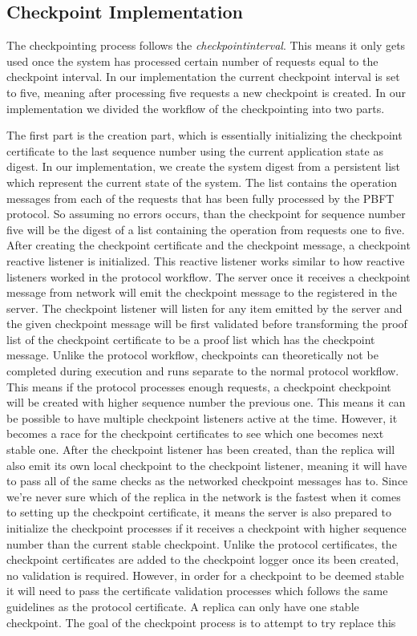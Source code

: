 \subsection{Checkpoint Implementation}
\label{section:ImpCheckpointing}
The checkpointing process follows the \emph{checkpointinterval}. This means it only gets used once the system has processed certain number of requests equal to the checkpoint interval. In our implementation the current checkpoint interval is set to five, meaning after processing five requests a new checkpoint is created. In our implementation we divided the workflow of the checkpointing into two parts. 

The first part is the creation part, which is essentially initializing the checkpoint certificate to the last sequence number using the current application state as digest. In our implementation, we create the system digest from a persistent list which represent the current state of the system. The list contains the operation messages from each of the requests that has been fully processed by the PBFT protocol. So assuming no errors occurs, than the checkpoint for sequence number five will be the digest of a list containing the operation from requests one to five. After creating the checkpoint certificate and the checkpoint message, a checkpoint reactive listener is initialized. This reactive listener works similar to how reactive listeners worked in the protocol workflow. The server once it receives a checkpoint message from network will emit the checkpoint message to the  registered in the server. The checkpoint listener will listen for any item emitted by the server and the given checkpoint message will be first validated before transforming the proof list of the checkpoint  certificate to be a proof list which has the checkpoint message. Unlike the protocol workflow, checkpoints can theoretically not be completed during execution and runs separate to the normal protocol workflow. This means if the protocol processes enough requests, a checkpoint checkpoint will be created with higher sequence number the previous one. This means it can be possible to have multiple checkpoint listeners active at the time. However, it becomes a race for the checkpoint certificates to see which one becomes next stable one. After the checkpoint listener has been created, than the replica will also emit its own local checkpoint to the checkpoint listener, meaning it will have to pass all of the same checks as the networked checkpoint messages has to. Since we're never sure which of the replica in the network is the fastest when it comes to setting up the checkpoint certificate, it means the server is also prepared to initialize the checkpoint processes if it receives a checkpoint with higher sequence number than the current stable checkpoint. Unlike the protocol certificates, the checkpoint certificates are added to the checkpoint logger once its been created, no validation is required. However, in order for a checkpoint to be deemed stable it will need to pass the certificate validation processes which follows the same guidelines as the protocol certificate. A replica can only have one stable checkpoint. The goal of the checkpoint process is to attempt to try replace this 